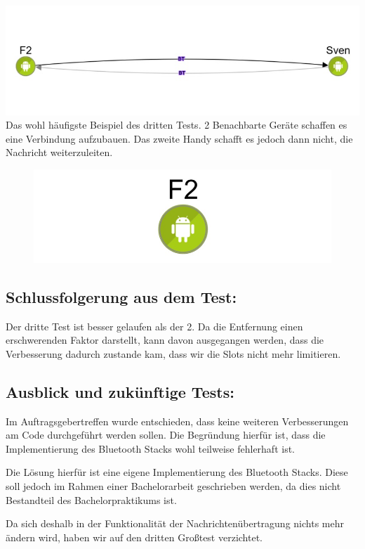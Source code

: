 \includegraphics{belege/grosstests/Bilder/Grosstest2/Test3Misserfolg2.jpg}
Das wohl häufigste Beispiel des dritten Tests. 2 Benachbarte Geräte
schaffen es eine Verbindung aufzubauen. Das zweite Handy schafft es
jedoch dann nicht, die Nachricht weiterzuleiten.

\begin{figure}[htbp]
\centering
\includegraphics{belege/grosstests/Bilder/Grosstest2/Test3Misserfolg3.jpg}
\caption{}
\end{figure}

\clearpage\subsection{Schlussfolgerung aus dem
Test:}\label{schlussfolgerung-aus-dem-test-4}

Der dritte Test ist besser gelaufen als der 2. Da die Entfernung einen
erschwerenden Faktor darstellt, kann davon ausgegangen werden, dass die
Verbesserung dadurch zustande kam, dass wir die Slots nicht mehr
limitieren.

\clearpage\subsection{Ausblick und zukünftige
Tests:}\label{ausblick-und-zukuxfcnftige-tests}

Im Auftragsgebertreffen wurde entschieden, dass keine weiteren
Verbesserungen am Code durchgeführt werden sollen. Die Begründung
hierfür ist, dass die Implementierung des Bluetooth Stacks wohl
teilweise fehlerhaft ist.

Die Lösung hierfür ist eine eigene Implementierung des Bluetooth Stacks.
Diese soll jedoch im Rahmen einer Bachelorarbeit geschrieben werden, da
dies nicht Bestandteil des Bachelorpraktikums ist.

Da sich deshalb in der Funktionalität der Nachrichtenübertragung nichts
mehr ändern wird, haben wir auf den dritten Großtest verzichtet.
